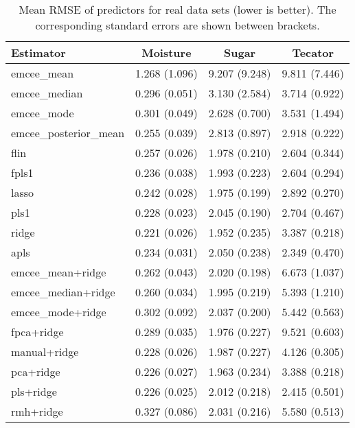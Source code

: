 \begin{table}[htbp!]
  \centering
  \begin{tabular}{lccc}
\toprule
            \textbf{Estimator} &            \textbf{Moisture} &           \textbf{Sugar} &           \textbf{Tecator} \\
\midrule
          emcee\_mean & 1.268 (1.096) & 9.207 (9.248) & 9.811 (7.446) \\
        emcee\_median & 0.296 (0.051) & 3.130 (2.584) & 3.714 (0.922) \\
          emcee\_mode & 0.301 (0.049) & 2.628 (0.700) & 3.531 (1.494) \\
emcee\_posterior\_mean & 0.255 (0.039) & 2.813 (0.897) & 2.918 (0.222) \\
                flin & 0.257 (0.026) & 1.978 (0.210) & 2.604 (0.344) \\
               fpls1 & 0.236 (0.038) & 1.993 (0.223) & 2.604 (0.294) \\
               lasso & 0.242 (0.028) & 1.975 (0.199) & 2.892 (0.270) \\
                pls1 & 0.228 (0.023) & 2.045 (0.190) & 2.704 (0.467) \\
               ridge & 0.221 (0.026) & 1.952 (0.235) & 3.387 (0.218) \\
               apls & 0.234 (0.031) & 2.050 (0.238) & 2.349 (0.470) \\
\bottomrule
\toprule
  emcee\_mean+ridge & 0.262 (0.043) & 2.020 (0.198) & 6.673 (1.037) \\
emcee\_median+ridge & 0.260 (0.034) & 1.995 (0.219) & 5.393 (1.210) \\
  emcee\_mode+ridge & 0.302 (0.092) & 2.037 (0.200) & 5.442 (0.563) \\
        fpca+ridge & 0.289 (0.035) & 1.976 (0.227) & 9.521 (0.603) \\
      manual+ridge & 0.228 (0.026) & 1.987 (0.227) & 4.126 (0.305) \\
         pca+ridge & 0.226 (0.027) & 1.963 (0.234) & 3.388 (0.218) \\
         pls+ridge & 0.226 (0.025) & 2.012 (0.218) & 2.415 (0.501) \\
         rmh+ridge & 0.327 (0.086) & 2.031 (0.216) & 5.580 (0.513) \\
\bottomrule
\end{tabular}
  \caption{Mean RMSE of predictors for real data sets (lower is better). The corresponding standard errors are shown between brackets.}
\end{table}


